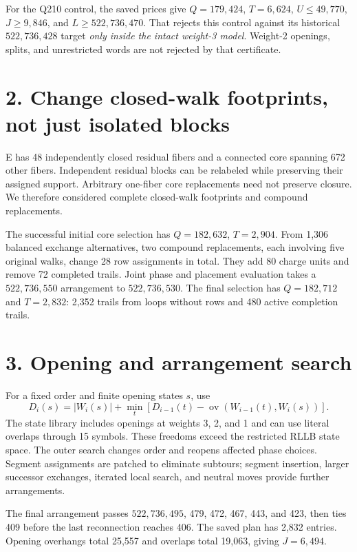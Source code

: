 \documentclass[11pt]{article}
\begin{document}
For the Q210 control, the saved prices give $Q=179{,}424$, $T=6{,}624$,
$U\leq49{,}770$, $J\geq9{,}846$, and $L\geq522{,}736{,}470$.
That rejects this control against its historical $522{,}736{,}428$ target
\emph{only inside the intact weight-3 model}. Weight-2 openings, splits,
and unrestricted words are not rejected by that certificate.

\section*{2. Change closed-walk footprints, not just isolated blocks}
E has 48 independently closed residual fibers and a connected core spanning
672 other fibers. Independent residual blocks can be relabeled while
preserving their assigned support. Arbitrary one-fiber core replacements
need not preserve closure. We therefore considered complete closed-walk
footprints and compound replacements.

The successful initial core selection has $Q=182{,}632$, $T=2{,}904$.
From 1,306 balanced exchange alternatives, two compound replacements,
each involving five original walks, change 28 row assignments in total.
They add 80 charge units and remove 72 completed trails. Joint phase and
placement evaluation takes a $522{,}736{,}550$ arrangement to
$522{,}736{,}530$. The final selection has $Q=182{,}712$ and $T=2{,}832$:
2,352 trails from loops without rows and 480 active completion trails.

\section*{3. Opening and arrangement search}
For a fixed order and finite opening states $s$, use
\[
D_i(s)=|W_i(s)|+\min_t\left[D_{i-1}(t)-\operatorname{ov}(W_{i-1}(t),W_i(s))\right].
\]
The state library includes openings at weights 3, 2, and 1 and can use
literal overlaps through 15 symbols. These freedoms exceed the restricted
RLLB state space. The outer search changes order and reopens affected
phase choices. Segment assignments are patched to eliminate subtours;
segment insertion, larger successor exchanges, iterated local search,
and neutral moves provide further arrangements.

The final arrangement passes $522{,}736{,}495$, 479, 472, 467, 443, and
423, then ties 409 before the last reconnection reaches 406.
The saved plan has 2,832 entries. Opening overhangs total 25,557 and
overlaps total 19,063, giving $J=6,494$.
\end{document}
